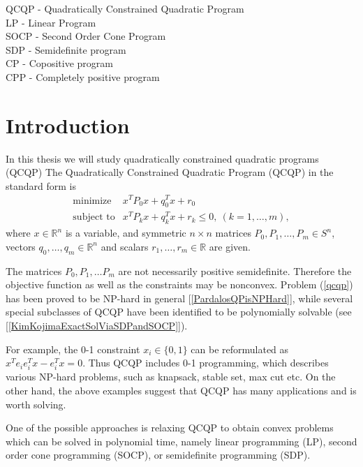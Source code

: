 \documentclass[12pt]{book}
\theoremstyle{definition}
\begin{document}
QCQP - Quadratically Constrained Quadratic Program \\
LP - Linear Program \\
SOCP - Second Order Cone Program \\
SDP - Semidefinite program \\
CP - Copositive program \\
CPP - Completely positive program \\


\chapter{Introduction}

In this thesis we will study quadratically constrained quadratic programs (QCQP)
\label{defQCQP}
The Quadratically Constrained Quadratic Program (QCQP) in the standard form is
\begin{equation}
\label{qcqp} 
\begin{array}{ll}
\mbox{minimize}& x^TP_0x + q_0^Tx +r_0 \\
\mbox{subject to}& x^TP_kx + q_k^Tx + r_k \leq 0, \  (k = 1,\dots ,m),
\end{array} 
\end{equation}
where $x\in \mathbb{R}^n$ is a variable, and symmetric $n\times n$ matrices $P_0, P_1, \dots ,P_m \in S^n$, vectors $q_0,\dots ,q_m \in \mathbb{R}^n$ and scalars $r_1,\dots ,r_m\in \mathbb{R}$ are given.

The matrices $P_0, P_1, \dots P_m$ are not necessarily positive semidefinite. Therefore the objective function as well as the constraints may be nonconvex. Problem (\ref{qcqp}) has been proved to be NP-hard in general [\ref{PardalosQPisNPHard}], while several special subclasses
of QCQP have been identified to be polynomially solvable (see [\ref{KimKojimaExactSolViaSDPandSOCP}]).

For example, the 0-1 constraint $x_i\in \{0,1\}$ can be reformulated as $x^Te_ie_i^Tx - e_i^Tx =0$. Thus QCQP includes 0-1 programming, which describes various NP-hard problems, such as knapsack, stable set, max cut etc. 
On the other hand, the above examples suggest that QCQP has many applications and is worth solving.

One of the possible approaches is relaxing QCQP to obtain convex problems which can be solved in polynomial time, namely linear programming (LP), second order cone programming  (SOCP), or semidefinite programming (SDP). 
\end{document}
